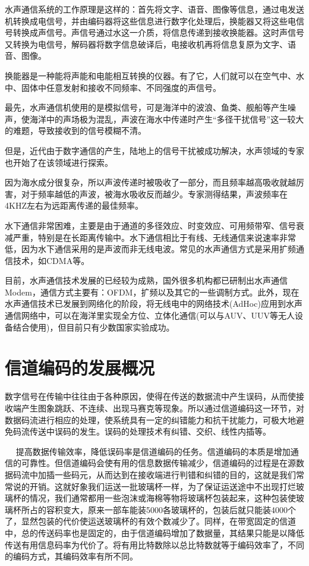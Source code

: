 水声通信系统的工作原理是这样的：首先将文字、语音、图像等信息，通过电发送机转换成电信号，并由编码器将这些信息进行数字化处理后，换能器又将这些电信号转换成声信号。声信号通过水这一介质，将信息传递到接收换能器。这时声信号又转换为电信号，解码器将数字信息破译后，电接收机再将信息复原为文字、语音、图像。

换能器是一种能将声能和电能相互转换的仪器。有了它，人们就可以在空气中、水中、固体中任意发射和接收不同频率、不同强度的声信号。

最先，水声通信机使用的是模拟信号，可是海洋中的波浪、鱼类、舰船等产生噪声，使海洋中的声场极为混乱，声波在海水中传递时产生“多径干扰信号”这一较大的难题，导致接收到的信号模糊不清。

但是，近代由于数字通信的产生，陆地上的信号干扰被成功解决，水声领域的专家也开始了在该领域进行探索。

因为海水成分很复杂，所以声波传递时被吸收了一部分，而且频率越高吸收就越厉害，对于频率越低的声波，被海水吸收反而越少。专家测得结果，声波频率在4KHZ左右为远距离传递的最佳频率。

水下通信非常困难，主要是由于通道的多径效应、时变效应、可用频带窄、信号衰减严重，特别是在长距离传输中。水下通信相比于有线、无线通信来说速率非常低，因为水下通信采用的是声波而非无线电波。常见的水声通信方式是采用扩频通信技术，如CDMA等。

目前，水声通信技术发展的已经较为成熟，国外很多机构都已研制出水声通信Modem，通信方式主要有：OFDM，扩频以及其它的一些调制方式。此外，现在水声通信技术已发展到网络化的阶段，将无线电中的网络技术(AdHoc)应用到水声通信网络中，可以在海洋里实现全方位、立体化通信(可以与AUV、UUV等无人设备结合使用)，但目前只有少数国家实验成功。
\section{信道编码的发展概况}
数字信号在传输中往往由于各种原因，使得在传送的数据流中产生误码，从而使接收端产生图象跳跃、不连续、出现马赛克等现象。所以通过信道编码这一环节，对数据码流进行相应的处理，使系统具有一定的纠错能力和抗干扰能力，可极大地避免码流传送中误码的发生。误码的处理技术有纠错、交织、线性内插等。 

　
提高数据传输效率，降低误码率是信道编码的任务。信道编码的本质是增加通信的可靠性。但信道编码会使有用的信息数据传输减少，信道编码的过程是在源数据码流中加插一些码元，从而达到在接收端进行判错和纠错的目的，这就是我们常常说的开销。这就好象我们运送一批玻璃杯一样，为了保证运送途中不出现打烂玻璃杯的情况，我们通常都用一些泡沫或海棉等物将玻璃杯包装起来，这种包装使玻璃杯所占的容积变大，原来一部车能装5000各玻璃杯的，包装后就只能装4000个了，显然包装的代价使运送玻璃杯的有效个数减少了。同样，在带宽固定的信道中，总的传送码率也是固定的，由于信道编码增加了数据量，其结果只能是以降低传送有用信息码率为代价了。将有用比特数除以总比特数就等于编码效率了，不同的编码方式，其编码效率有所不同。

